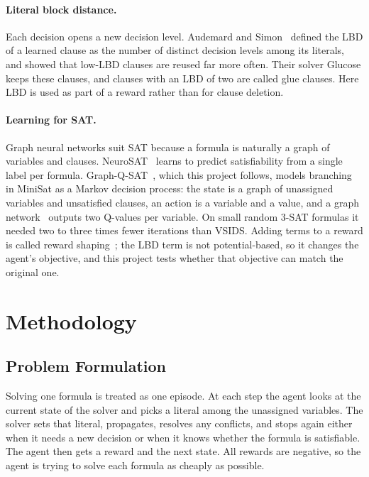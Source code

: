 \documentclass[11pt,a4paper]{article}
\begin{document}
\paragraph{Literal block distance.} Each decision opens a new decision level. Audemard and Simon~\cite{audemard2009glucose} defined the LBD of a learned clause as the number of distinct decision levels among its literals, and showed that low-LBD clauses are reused far more often. Their solver Glucose keeps these clauses, and clauses with an LBD of two are called glue clauses. Here LBD is used as part of a reward rather than for clause deletion.

\paragraph{Learning for SAT.} Graph neural networks suit SAT because a formula is naturally a graph of variables and clauses. NeuroSAT~\cite{selsam2019neurosat} learns to predict satisfiability from a single label per formula. Graph-Q-SAT~\cite{kurin2020gqsat}, which this project follows, models branching in MiniSat as a Markov decision process: the state is a graph of unassigned variables and unsatisfied clauses, an action is a variable and a value, and a graph network~\cite{battaglia2018relational} outputs two Q-values per variable. On small random 3-SAT formulas it needed two to three times fewer iterations than VSIDS. Adding terms to a reward is called reward shaping~\cite{ng1999shaping}; the LBD term is not potential-based, so it changes the agent's objective, and this project tests whether that objective can match the original one.

\section{Methodology}
\label{sec:method}

\subsection{Problem Formulation}

Solving one formula is treated as one episode. At each step the agent looks at the current state of the solver and picks a literal among the unassigned variables. The solver sets that literal, propagates, resolves any conflicts, and stops again either when it needs a new decision or when it knows whether the formula is satisfiable. The agent then gets a reward and the next state. All rewards are negative, so the agent is trying to solve each formula as cheaply as possible.
\end{document}
